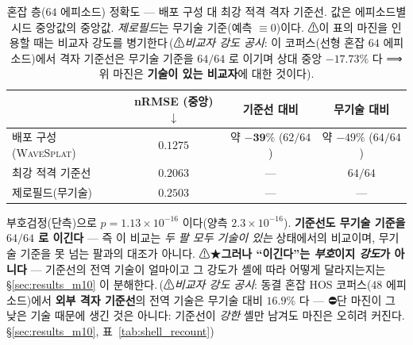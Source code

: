\documentclass[11pt]{report}
\numberwithin{equation}{chapter}
\numberwithin{figure}{chapter}
\numberwithin{table}{chapter}
\newcommand{\WS}{\textsc{WaveSplat}}
\newcommand{\CmpSkillBOne}{\,(⚠\emph{비교자 강도 공시}: 이 코퍼스(선형 혼잡 $64$
  에피소드)에서 격자 기준선은 무기술 기준을 $64/64$ 로 이기며 상대 중앙 $-17.73\%$ 다
  ⟹ 위 마진은 \textbf{기술이 있는 비교자}에 대한 것이다)}
\newcommand{\CmpSkill}{\,(⚠\emph{비교자 강도 공시}: 동결 혼잡 HOS 코퍼스($48$ 에피소드)에서
\textbf{외부 격자 기준선}의 전역 기술은 무기술 대비 $16.9\%$ 다 --- ⛔단 마진이 그 낮은
기술 때문에 생긴 것은 아니다: 기준선이 \emph{강한} 셸만 남겨도 마진은 오히려 커진다.
\S\ref{sec:results_m10}, 표~\ref{tab:shell_recount})}
\begin{document}
\begin{table}[htbp]
\centering
\caption{혼잡 층($64$ 에피소드) 정확도 --- 배포 구성 대 최강 적격 격자 기준선.
값은 에피소드별 시드 중앙값의 중앙값. \emph{제로필드}는 무기술 기준(예측 $\equiv 0$)이다.
⚠이 표의 마진을 인용할 때는 비교자 강도를 병기한다\CmpSkillBOne{}.}
\label{tab:b1_crowded}
\begin{tabular}{lccc}
\toprule
 & nRMSE (중앙) $\downarrow$ & 기준선 대비 & 무기술 대비 \\
\midrule
배포 구성(\WS{}) & $\mathbf{0.1275}$ & 약 $\mathbf{-39\%}$ ($62/64$) & 약 $-49\%$ ($64/64$) \\
최강 적격 기준선  & $0.2063$ & --- & $64/64$ \\
제로필드(무기술)  & $0.2503$ & --- & --- \\
\bottomrule
\end{tabular}
\end{table}

부호검정(단측)으로 $p = 1.13\times10^{-16}$ 이다(양측 $2.3\times10^{-16}$).
\textbf{기준선도 무기술 기준을 $64/64$ 로 이긴다} --- 즉 이 비교는 \emph{두 팔 모두 기술이 있는}
상태에서의 비교이며, 무기술 기준을 못 넘는 팔과의 대조가 아니다.
⚠★\textbf{그러나 ``이긴다''는 \emph{부호}이지 \emph{강도}가 아니다} --- 기준선의 전역
기술이 얼마이고 그 강도가 셸에 따라 어떻게 달라지는지는 \S\ref{sec:results_m10} 이
분해한다.\CmpSkill{}
\end{document}
